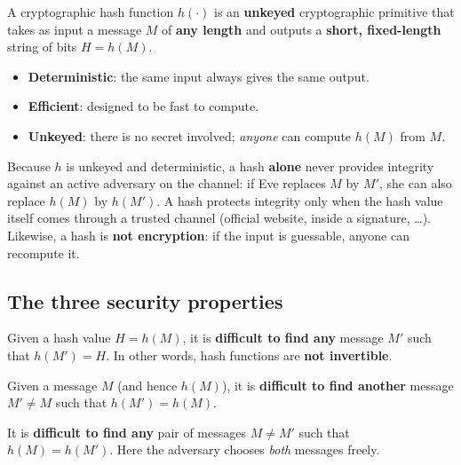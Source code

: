 \begin{definition}
A cryptographic hash function $h(\cdot)$ is an \textbf{unkeyed} cryptographic primitive that takes as input a message $M$ of \textbf{any length} and outputs a \textbf{short, fixed-length} string of bits $H = h(M)$.
\begin{itemize}
    \item \textbf{Deterministic}: the same input always gives the same output.
    \item \textbf{Efficient}: designed to be fast to compute.
    \item \textbf{Unkeyed}: there is no secret involved; \emph{anyone} can compute $h(M)$ from $M$.
\end{itemize}
\end{definition}

\begin{remark}
Because $h$ is unkeyed and deterministic, a hash \textbf{alone} never provides integrity against an active adversary on the channel: if Eve replaces $M$ by $M'$, she can also replace $h(M)$ by $h(M')$. A hash protects integrity only when the hash value itself comes through a trusted channel (official website, inside a signature, \dots). Likewise, a hash is \textbf{not encryption}: if the input is guessable, anyone can recompute it.
\end{remark}

\subsection{The three security properties}

\begin{definition}
Given a hash value $H = h(M)$, it is \textbf{difficult to find any} message $M'$ such that $h(M') = H$. In other words, hash functions are \textbf{not invertible}.
\end{definition}

\begin{definition}
Given a message $M$ (and hence $h(M)$), it is \textbf{difficult to find another} message $M' \neq M$ such that $h(M') = h(M)$.
\end{definition}

\begin{definition}
It is \textbf{difficult to find any} pair of messages $M \neq M'$ such that $h(M) = h(M')$. Here the adversary chooses \emph{both} messages freely.
\end{definition}

